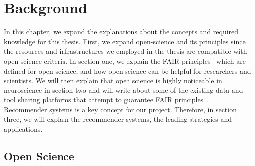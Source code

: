 \chapter{Background}
\label{background}



In this chapter, we expand the explanations about the concepts and required knowledge for this thesis. First, we expand open-science and its principles since the resources and infrastructures we employed in the thesis are compatible with open-science criteria. In section one, we explain the FAIR principles~\cite{FAIR_Principles} which are defined for open science, and how open science can be helpful for researchers and scientists.
We will then explain that open science is highly noticeable in neuroscience in section two and will write about some of the existing data and tool sharing platforms that attempt to guarantee FAIR principles~\cite{wilkinson2016fair}. Recommender systems is a key concept for our project. Therefore, in section three, we will explain the recommender systems, the leading strategies and applications.





\section{Open Science}

